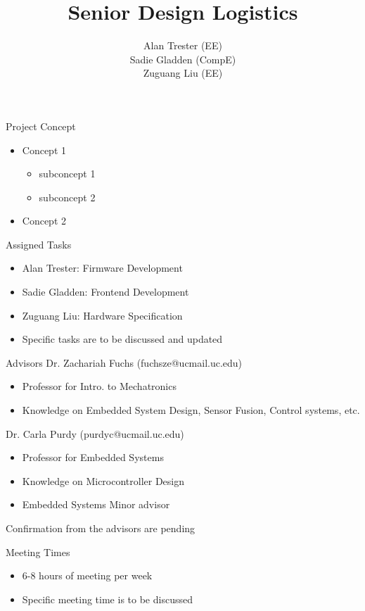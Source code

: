 \documentclass{beamer}
\title{Senior Design Logistics}
\author{Alan Trester (EE) \\ Sadie Gladden (CompE) \\ Zuguang Liu (EE)}
\begin{document}
	
	\begin{frame}[plain]
		\maketitle
	\end{frame}
	\begin{frame}{Project Concept}
		\begin{itemize}
			\item Concept 1
			\begin{itemize}
				\item subconcept 1
				\item subconcept 2 
			\end{itemize}
			\item Concept 2
		\end{itemize}
	\end{frame}
	
	\begin{frame}{Assigned Tasks}
		\begin{itemize}
			\item Alan Trester: Firmware Development
			\item Sadie Gladden: Frontend Development
			\item Zuguang Liu: Hardware Specification
			\item Specific tasks are to be discussed and updated
		\end{itemize}
	\end{frame}
	
	\begin{frame}{Advisors}
		Dr. Zachariah Fuchs (fuchsze@ucmail.uc.edu)
		\begin{itemize}
			\item Professor for Intro. to Mechatronics
			\item Knowledge on Embedded System Design, Sensor Fusion, Control systems, etc.
		\end{itemize}
		Dr. Carla Purdy (purdyc@ucmail.uc.edu)
		\begin{itemize}
			\item Professor for Embedded Systems
			\item Knowledge on Microcontroller Design
			\item Embedded Systems Minor advisor
		\end{itemize}
		Confirmation from the advisors are pending
	\end{frame}
	
	\begin{frame}{Meeting Times}
		\begin{itemize}
			\item 6-8 hours of meeting per week
			\item Specific meeting time is to be discussed
		\end{itemize}
	\end{frame}
	
\end{document}
